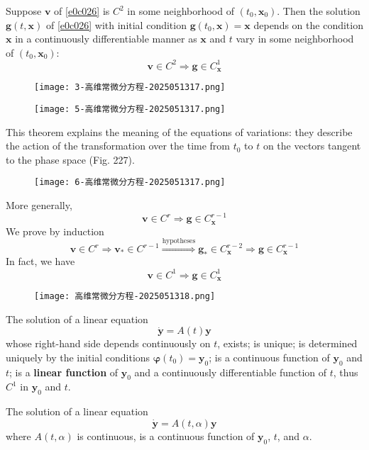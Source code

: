 Suppose $\boldsymbol{v}$ of \cref{e0c026} is $C^{2}$ in some neighborhood of $(t_0,\boldsymbol{x}_{0})$. Then the solution $\boldsymbol{g}(t,\boldsymbol{x})$ of  \cref{e0c026} with initial condition $\boldsymbol{g}(t_0,\boldsymbol{x})=\boldsymbol{x}$ depends on the condition $\boldsymbol{x}$ in a continuously differentiable manner as $\boldsymbol{x}$ and $t$ vary in some neighborhood of $(t_0,\boldsymbol{x}_{0})$:
\[
\boldsymbol{v}\in C^{2}\Rightarrow \boldsymbol{g}\in C^{1}_{\boldsymbol{x}}
\]
\begin{figure}[H]
\centering
\texttt{[image: 3-高维常微分方程-2025051317.png]}
\label{}
\end{figure}

\begin{figure}[H]
\centering
\texttt{[image: 5-高维常微分方程-2025051317.png]}
\label{}
\end{figure}
This theorem explains the meaning of the equations of variations: they describe the action of the transformation over the time from $t_0$ to $t$ on the vectors tangent to the phase space (Fig. 227).
\begin{figure}[H]
\centering
\texttt{[image: 6-高维常微分方程-2025051317.png]}
\label{}
\end{figure}

More generally,
\[
\boldsymbol{v}\in C^{r}\Rightarrow \boldsymbol{g}\in C^{r-1}_{\boldsymbol{x}}
\]
We prove by induction
\[
\boldsymbol{v}\in C^{r}\Rightarrow \boldsymbol{v}_{*}\in C^{r-1}\overset{ \text{hypotheses} }{ \Rightarrow  }\boldsymbol{g}_{*}\in C^{r-2}_{\boldsymbol{x}}\Rightarrow \boldsymbol{g}\in C^{r-1}_{\boldsymbol{x}}
\]
In fact, we have
\[
\boldsymbol{v}\in C^{1}\Rightarrow \boldsymbol{g}\in C^{1}_{\boldsymbol{x}}
\]
\begin{figure}[H]
\centering
\texttt{[image: 高维常微分方程-2025051318.png]}
\label{}
\end{figure}

\begin{lemma}
The solution of a linear equation
\[
\dot{\boldsymbol{y}}=A(t)\boldsymbol{y}
\]whose right-hand side depends continuously on $t$, exists; is unique; is determined uniquely by the initial conditions $\boldsymbol{\varphi}(t_0)=\boldsymbol{y}_{0}$; is a continuous function of $\boldsymbol{y}_{0}$ and $t$; is a \textbf{linear function} of $\boldsymbol{y}_{0}$ and a continuously differentiable function of $t$, thus $C^{1}$ in $\boldsymbol{y}_{0}$ and $t$.
\end{lemma}
\begin{lemma}
The solution of a linear equation
\[
\dot{\boldsymbol{y}}=A(t,\alpha)\boldsymbol{y}
\]where $A(t,\alpha)$ is continuous, is a continuous function of $\boldsymbol{y}_{0}$, $t$, and $\alpha$.\label{2cddf1}
\end{lemma}

